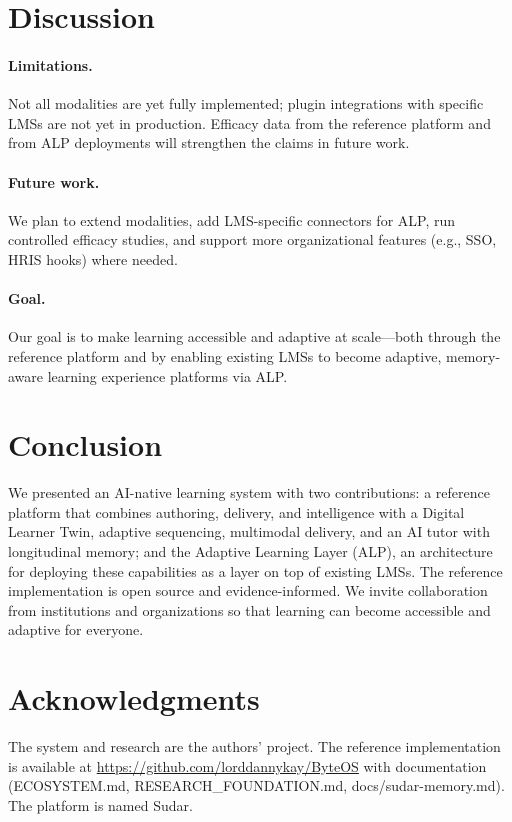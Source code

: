 \documentclass[10pt,twocolumn]{article}
\begin{document}
\section{Discussion}
\label{sec:discussion}

\paragraph{Limitations.}
Not all modalities are yet fully implemented; plugin integrations with specific LMSs are not yet in production. Efficacy data from the reference platform and from ALP deployments will strengthen the claims in future work.

\paragraph{Future work.}
We plan to extend modalities, add LMS-specific connectors for ALP, run controlled efficacy studies, and support more organizational features (e.g., SSO, HRIS hooks) where needed.

\paragraph{Goal.}
Our goal is to make learning accessible and adaptive at scale---both through the reference platform and by enabling existing LMSs to become adaptive, memory-aware learning experience platforms via ALP.

\section{Conclusion}
\label{sec:conclusion}

We presented an AI-native learning system with two contributions: a reference platform that combines authoring, delivery, and intelligence with a Digital Learner Twin, adaptive sequencing, multimodal delivery, and an AI tutor with longitudinal memory; and the Adaptive Learning Layer (ALP), an architecture for deploying these capabilities as a layer on top of existing LMSs. The reference implementation is open source and evidence-informed. We invite collaboration from institutions and organizations so that learning can become accessible and adaptive for everyone.

\section*{Acknowledgments}
The system and research are the authors' project. The reference implementation is available at \url{https://github.com/lorddannykay/ByteOS} with documentation (ECOSYSTEM.md, RESEARCH\_FOUNDATION.md, docs/sudar-memory.md). The platform is named Sudar.
\end{document}
